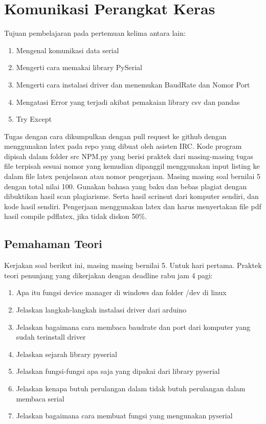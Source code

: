 \chapter{Komunikasi Perangkat Keras}

Tujuan pembelajaran pada pertemuan kelima antara lain:
\begin{enumerate}
\item
Mengenal komunikasi data serial
\item
Mengerti cara memakai library PySerial
\item
Mengerti cara instalasi driver dan menemukan BaudRate dan Nomor Port
\item
Mengatasi Error yang terjadi akibat pemakaian library csv dan pandas
\item
Try Except
\end{enumerate}
Tugas dengan cara dikumpulkan dengan pull request ke github dengan menggunakan latex pada repo yang dibuat oleh asisten IRC. Kode program dipisah dalam folder src NPM.py yang berisi praktek dari masing-masing tugas file terpisah sesuai nomor yang kemudian dipanggil menggunakan input listing ke dalam file latex penjelasan atau nomor pengerjaan. Masing masing soal bernilai 5 dengan total nilai 100. Gunakan bahasa yang baku dan bebas plagiat dengan dibuktikan hasil scan plagiarisme. Serta hasil scrinsut dari komputer sendiri, dan kode hasil sendiri. Pengerjaan menggunakan latex dan harus menyertakan file pdf hasil compile pdflatex, jika tidak diskon 50\%.


\section{Pemahaman Teori}
Kerjakan soal berikut ini, masing masing bernilai 5. Untuk hari pertama.
Praktek teori penunjang yang dikerjakan dengan deadline rabu jam 4 pagi:
\begin{enumerate}
\item
Apa itu fungsi device manager di windows dan folder /dev di linux
\item
Jelaskan langkah-langkah instalasi driver dari arduino
\item
Jelaskan bagaimana cara membaca baudrate dan port dari komputer yang sudah terinstall driver
\item
Jelaskan sejarah library pyserial
\item
Jelaskan fungsi-fungsi apa saja yang dipakai dari library pyserial
\item
Jelaskan kenapa butuh perulangan dalam tidak butuh perulangan dalam membaca serial
\item
Jelaskan bagaimana cara membuat fungsi yang mengunakan pyserial
\end{enumerate}

